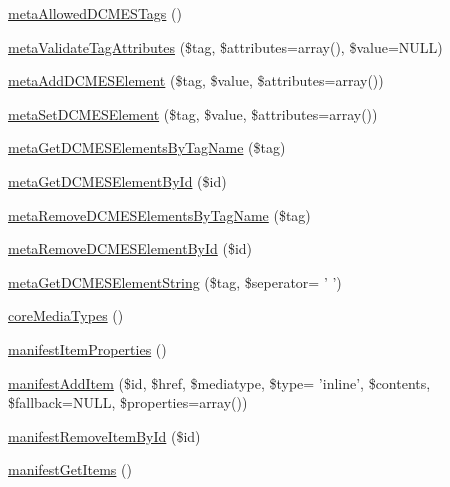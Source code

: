 \begin{DoxyCompactItemize}
\item 
\hyperlink{classFunnyMonkey_1_1EPUB_1_1EPUBPackage_a3122134b38f675e1c2be523c468c9bcc}{meta\-Allowed\-D\-C\-M\-E\-S\-Tags} ()
\item 
\hyperlink{classFunnyMonkey_1_1EPUB_1_1EPUBPackage_a36a67e2b5a93a93e94ad5fc5c6fdbbbf}{meta\-Validate\-Tag\-Attributes} (\$tag, \$attributes=array(), \$value=\-N\-U\-L\-L)
\item 
\hyperlink{classFunnyMonkey_1_1EPUB_1_1EPUBPackage_a297a1821728b6156ebfb66cc540cc8ed}{meta\-Add\-D\-C\-M\-E\-S\-Element} (\$tag, \$value, \$attributes=array())
\item 
\hyperlink{classFunnyMonkey_1_1EPUB_1_1EPUBPackage_ad74ab42549e1ed6066028502ef31cad1}{meta\-Set\-D\-C\-M\-E\-S\-Element} (\$tag, \$value, \$attributes=array())
\item 
\hyperlink{classFunnyMonkey_1_1EPUB_1_1EPUBPackage_afe2f084905fb9f2d4aeb705ed69d2f39}{meta\-Get\-D\-C\-M\-E\-S\-Elements\-By\-Tag\-Name} (\$tag)
\item 
\hyperlink{classFunnyMonkey_1_1EPUB_1_1EPUBPackage_a024d4b576495c7eafe0d9a58d7ff9314}{meta\-Get\-D\-C\-M\-E\-S\-Element\-By\-Id} (\$id)
\item 
\hyperlink{classFunnyMonkey_1_1EPUB_1_1EPUBPackage_a6099bacd458963d6df2d9183b4146e7a}{meta\-Remove\-D\-C\-M\-E\-S\-Elements\-By\-Tag\-Name} (\$tag)
\item 
\hyperlink{classFunnyMonkey_1_1EPUB_1_1EPUBPackage_a91957e6b8cbfe1883c8d11032ac9e14c}{meta\-Remove\-D\-C\-M\-E\-S\-Element\-By\-Id} (\$id)
\item 
\hyperlink{classFunnyMonkey_1_1EPUB_1_1EPUBPackage_a1e3dec00a6a87572b7bb59621d453ea7}{meta\-Get\-D\-C\-M\-E\-S\-Element\-String} (\$tag, \$seperator= ' ')
\item 
\hyperlink{classFunnyMonkey_1_1EPUB_1_1EPUBPackage_a5bc89c688cc494dcc419954dd510ca8c}{core\-Media\-Types} ()
\item 
\hyperlink{classFunnyMonkey_1_1EPUB_1_1EPUBPackage_a5542bc21113cf0800e8841dae41de545}{manifest\-Item\-Properties} ()
\item 
\hyperlink{classFunnyMonkey_1_1EPUB_1_1EPUBPackage_a744798070ee14c860a29423409f9e529}{manifest\-Add\-Item} (\$id, \$href, \$mediatype, \$type= 'inline', \$contents, \$fallback=\-N\-U\-L\-L, \$properties=array())
\item 
\hyperlink{classFunnyMonkey_1_1EPUB_1_1EPUBPackage_add7d2ec0ad2aabf11cb1a4f4822750a2}{manifest\-Remove\-Item\-By\-Id} (\$id)
\item 
\hyperlink{classFunnyMonkey_1_1EPUB_1_1EPUBPackage_ad263e2cd48e03a0eb43003c89bbafadc}{manifest\-Get\-Items} ()

\end{DoxyCompactItemize}
